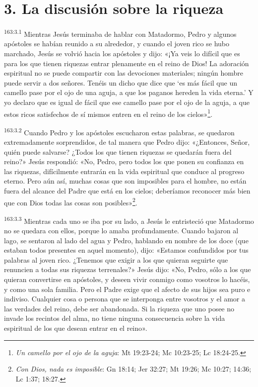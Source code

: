 \section*{3. La discusión sobre la riqueza}
\par 
\textsuperscript{163:3.1} Mientras Jesús terminaba de hablar con Matadormo, Pedro y algunos apóstoles se habían reunido a su alrededor, y cuando el joven rico se hubo marchado, Jesús se volvió hacia los apóstoles y dijo: «¡Ya veis lo difícil que es para los que tienen riquezas entrar plenamente en el reino de Dios! La adoración espiritual no se puede compartir con las devociones materiales; ningún hombre puede servir a dos señores. Tenéis un dicho que dice que `es más fácil que un camello pase por el ojo de una aguja, a que los paganos hereden la vida eterna.' Y yo declaro que es igual de fácil que ese camello pase por el ojo de la aguja, a que estos ricos satisfechos de sí mismos entren en el reino de los cielos»\footnote{\textit{Un camello por el ojo de la aguja}: Mt 19:23-24; Mc 10:23-25; Lc 18:24-25.}.

\par 
\textsuperscript{163:3.2} Cuando Pedro y los apóstoles escucharon estas palabras, se quedaron extremadamente sorprendidos, de tal manera que Pedro dijo: «¿Entonces, Señor, quién puede salvarse? ¿Todos los que tienen riquezas se quedarán fuera del reino?» Jesús respondió: «No, Pedro, pero todos los que ponen su confianza en las riquezas, difícilmente entrarán en la vida espiritual que conduce al progreso eterno. Pero aún así, muchas cosas que son imposibles para el hombre, no están fuera del alcance del Padre que está en los cielos; deberíamos reconocer más bien que con Dios todas las cosas son posibles»\footnote{\textit{Con Dios, nada es imposible}: Gn 18:14; Jer 32:27; Mt 19:26; Mc 10:27; 14:36; Lc 1:37; 18:27.}.

\par 
\textsuperscript{163:3.3} Mientras cada uno se iba por su lado, a Jesús le entristeció que Matadormo no se quedara con ellos, porque lo amaba profundamente. Cuando bajaron al lago, se sentaron al lado del agua y Pedro, hablando en nombre de los doce (que estaban todos presentes en aquel momento), dijo: «Estamos confundidos por tus palabras al joven rico. ¿Tenemos que exigir a los que quieran seguirte que renuncien a todas sus riquezas terrenales?» Jesús dijo: «No, Pedro, sólo a los que quieran convertirse en apóstoles, y deseen vivir conmigo como vosotros lo hacéis, y como una sola familia. Pero el Padre exige que el afecto de sus hijos sea puro e indiviso. Cualquier cosa o persona que se interponga entre vosotros y el amor a las verdades del reino, debe ser abandonada. Si la riqueza que uno posee no invade los recintos del alma, no tiene ninguna consecuencia sobre la vida espiritual de los que desean entrar en el reino».

